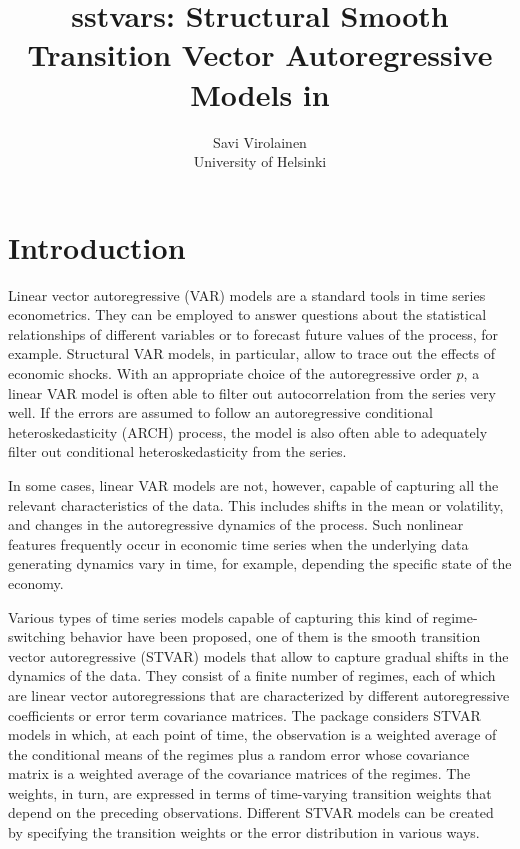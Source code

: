 \documentclass[nojss]{jss}
\author{Savi Virolainen\\ University of Helsinki}
\title{sstvars: Structural Smooth Transition Vector Autoregressive Models in \proglang{R}}
\begin{document}
\section{Introduction}
Linear vector autoregressive (VAR) models are a standard tools in time series econometrics. They can be employed to answer questions about the statistical relationships of different variables or to forecast future values of the process, for example. Structural VAR models, in particular, allow to trace out the effects of economic shocks. With an appropriate choice of the autoregressive order $p$, a linear VAR model is often able to filter out autocorrelation from the series very well. If the errors are assumed to follow an autoregressive conditional heteroskedasticity (ARCH) process, the model is also often able to adequately filter out conditional heteroskedasticity from the series.

In some cases, linear VAR models are not, however, capable of capturing all the relevant characteristics of the data. This includes shifts in the mean or volatility, and changes in the autoregressive dynamics of the process. Such nonlinear features frequently occur in economic time series when the underlying data generating dynamics vary in time, for example, depending the specific state of the economy.

Various types of time series models capable of capturing this kind of regime-switching behavior have been proposed, one of them is the smooth transition vector autoregressive (STVAR) models that allow to capture gradual shifts in the dynamics of the data. They consist of a finite number of regimes, each of which are linear vector autoregressions that are characterized by different autoregressive coefficients or error term covariance matrices. The package  considers STVAR models in which, at each point of time, the observation is a weighted average of the conditional means of the regimes plus a random error whose covariance matrix is a weighted average of the covariance matrices of the regimes. The weights, in turn, are expressed in terms of time-varying transition weights that depend on the preceding observations. Different STVAR models can be created by specifying the transition weights or the error distribution in various ways.
\end{document}
